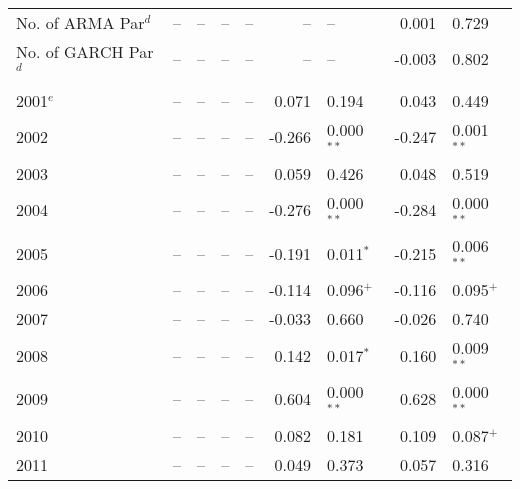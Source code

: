 \documentclass[12pt]{report}
\begin{document}
\begin{table}[!ht]
\begin{tabular}{l r l r l r l r l}
        No. of ARMA Par$^{d}$              &      -- & --           &      -- & --            &          -- & --             &   0.001 & 0.729          \\
        No. of GARCH Par$^{d}$             &      -- & --           &      -- & --            &          -- & --             &  -0.003 & 0.802          \\
                                                                                                                                                        \\      
        2001$^{e}$                         &      -- & --           &      -- & --            &       0.071 & 0.194          &   0.043 & 0.449          \\
        2002                               &      -- & --           &      -- & --            &      -0.266 & 0.000$^{**}$   &  -0.247 & 0.001$^{**}$   \\
        2003                               &      -- & --           &      -- & --            &       0.059 & 0.426          &   0.048 & 0.519          \\
        2004                               &      -- & --           &      -- & --            &      -0.276 & 0.000$^{**}$   &  -0.284 & 0.000$^{**}$   \\
        2005                               &      -- & --           &      -- & --            &      -0.191 & 0.011$^{*}$    &  -0.215 & 0.006$^{**}$   \\
        2006                               &      -- & --           &      -- & --            &      -0.114 & 0.096$^{+}$    &  -0.116 & 0.095$^{+}$    \\
        2007                               &      -- & --           &      -- & --            &      -0.033 & 0.660          &  -0.026 & 0.740          \\
        2008                               &      -- & --           &      -- & --            &       0.142 & 0.017$^{*}$    &   0.160 & 0.009$^{**}$   \\
        2009                               &      -- & --           &      -- & --            &       0.604 & 0.000$^{**}$   &   0.628 & 0.000$^{**}$   \\
        2010                               &      -- & --           &      -- & --            &       0.082 & 0.181          &   0.109 & 0.087$^{+}$    \\
        2011                               &      -- & --           &      -- & --            &       0.049 & 0.373          &   0.057 & 0.316          \\

\end{tabular}
\end{table}
\end{document}
